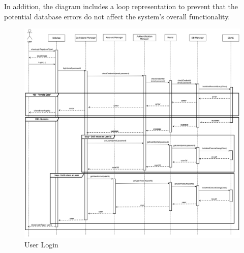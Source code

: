\documentclass[a4paper,12pt]{article}
\begin{document}
    In addition, the diagram includes a loop representation to prevent that the potential database errors do not affect the system's overall functionality.
    \begin{figure}[H]
    \centering
    \includegraphics[scale = 0.35]{DD_figures/RuntimeView/UserLogin.drawio.png}
    \caption{User Login}
\end{figure}
\end{document}
